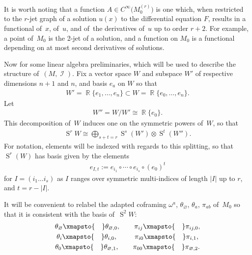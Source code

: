 \documentclass[pdftex]{sigma}
\DeclareMathOperator{\R}{\mathbb{R}}
\DeclareMathOperator{\Sym}{S}
\DeclareMathOperator{\I}{\mathcal{I}}
\newcommand{\cinfinity}[1]{C^\infty\big(#1\big)}
\newcommand{\M}[1]{M_0^{(#1)}}
\newcommand{\thetas}[1]{\theta_{#1}}
\newcommand{\pis}[1]{\pi_{#1}}
\numberwithin{equation}{section}
\begin{document}
It is worth noting that a function $A \in \cinfinity{\M{r}}$ is one which, when restricted to the $r$-jet graph of a solution $u(x)$ to the differential equation $F$, results in a functional of~$x$, of~$u$, and of~the derivatives of~$u$ up to order $r+2$. For example, a point of~$M_0$ is the 2-jet of a solution, and a function on $M_0$ is a functional depending on at most second derivatives of solutions.

Now for some linear algebra preliminaries, which will be used to describe the structure of~$(M,\I)$. Fix a vector space $W$ and subspace $W'$ of respective dimensions $n+1$ and $n$, and basis $e_a$ on $W$ so that
\begin{gather*}
W' = \R\{e_1 , \dots , e_n\} \subset W = \R\{e_0 , \dots , e_n\} .
\end{gather*}
Let
\begin{gather*}
W'' = W/W' \cong \R\{e_0\} .
\end{gather*}
This decomposition of~$W$ induces one on the symmetric powers of~$W$, so that
\begin{gather*}
\Sym^{r} W \cong \bigoplus_{s+t= r} \Sym^s( W') \otimes \Sym^t( W'') .
\end{gather*}
For notation, elements will be indexed with regards to this splitting, so that $\Sym^r(W)$ has basis given by the elements
\begin{gather*}
e_{I,t} := e_{i_1}{\circ}\cdots{\circ}e_{i_s}{\circ}(e_0)^{t}
\end{gather*}
for $I = (i_1\dots i_s)$ as $I$ ranges over symmetric multi-indices of length $|I|$ up to $r$, and $t = r -|I|$.

It will be convenient to relabel the adapted coframing $\omega^a$, $\thetas{\varnothing}$, $\thetas{a}$, $\pis{ab}$ of~$M_0$
so that it is consistent with the basis of~$\Sym^2 W$:
\begin{gather*}
 \thetas{\varnothing} \xmapsto{\quad} \thetas{\varnothing,0}, \qquad \pis{ij} \xmapsto{\quad} \pis{ij,0},
 \\
 \thetas{i} \xmapsto{\quad} \thetas{i,0},\qquad \ \,\pis{i0} \xmapsto{\quad} \pis{i,1},
 \\
 \thetas{0} \xmapsto{\quad} \thetas{\varnothing,1},\qquad \pis{00} \xmapsto{\quad} \pis{\varnothing, 2}.
\end{gather*}
\end{document}
